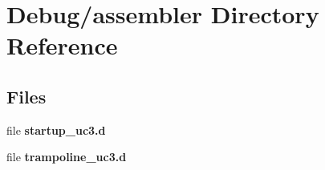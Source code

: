 \section{Debug/assembler Directory Reference}
\label{dir_86c19322d54d056803d3067a3edc00e0}
\subsection*{Files}
\begin{DoxyCompactItemize}
\item 
file {\bfseries startup\+\_\+uc3.\+d}
\item 
file {\bfseries trampoline\+\_\+uc3.\+d}
\end{DoxyCompactItemize}

